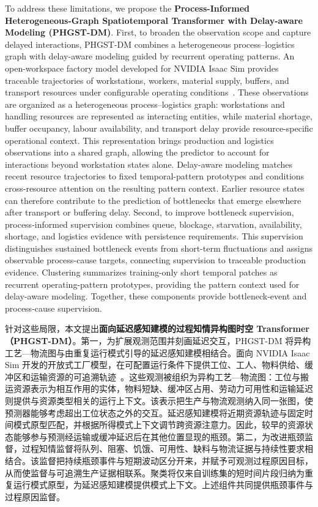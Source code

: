 \documentclass[a4paper,fleqn]{cas-dc}
\newcommand{\zhpara}[1]{%
  \par\begingroup\small\color{black!72}\noindent #1\par\endgroup}
\begin{document}
To address these limitations, we propose the \textbf{Process-Informed Heterogeneous-Graph Spatiotemporal Transformer with Delay-aware Modeling (PHGST-DM)}. First, to broaden the observation scope and capture delayed interactions, PHGST-DM combines a heterogeneous process--logistics graph with delay-aware modeling guided by recurrent operating patterns. An open-workspace factory model developed for NVIDIA Isaac Sim provides traceable trajectories of workstations, workers, material supply, buffers, and transport resources under configurable operating conditions~\cite{lu2020digital,isaacsim2026,xue2026safe}. These observations are organized as a heterogeneous process--logistics graph: workstations and handling resources are represented as interacting entities, while material shortage, buffer occupancy, labour availability, and transport delay provide resource-specific operational context. This representation brings production and logistics observations into a shared graph, allowing the predictor to account for interactions beyond workstation states alone. Delay-aware modeling matches recent resource trajectories to fixed temporal-pattern prototypes and conditions cross-resource attention on the resulting pattern context. Earlier resource states can therefore contribute to the prediction of bottlenecks that emerge elsewhere after transport or buffering delay. Second, to improve bottleneck supervision, process-informed supervision combines queue, blockage, starvation, availability, shortage, and logistics evidence with persistence requirements. This supervision distinguishes sustained bottleneck events from short-term fluctuations and assigns observable process-cause targets, connecting supervision to traceable production evidence. Clustering summarizes training-only short temporal patches as recurrent operating-pattern prototypes, providing the pattern context used for delay-aware modeling. Together, these components provide bottleneck-event and process-cause supervision.

\zhpara{针对这些局限，本文提出\textbf{面向延迟感知建模的过程知情异构图时空 Transformer（PHGST-DM）}。第一，为扩展观测范围并刻画延迟交互，PHGST-DM 将异构工艺—物流图与由重复运行模式引导的延迟感知建模相结合。面向 NVIDIA Isaac Sim 开发的开放式工厂模型，在可配置运行条件下提供工位、工人、物料供给、缓冲区和运输资源的可追溯轨迹~\cite{lu2020digital,isaacsim2026,xue2026safe}。这些观测被组织为异构工艺—物流图：工位与搬运资源表示为相互作用的实体，物料短缺、缓冲区占用、劳动力可用性和运输延迟则提供与资源类型相关的运行上下文。该表示把生产与物流观测纳入同一张图，使预测器能够考虑超出工位状态之外的交互。延迟感知建模将近期资源轨迹与固定时间模式原型匹配，并根据所得模式上下文调节跨资源注意力。因此，较早的资源状态能够参与预测经运输或缓冲延迟后在其他位置显现的瓶颈。第二，为改进瓶颈监督，过程知情监督将队列、阻塞、饥饿、可用性、缺料与物流证据与持续性要求相结合。该监督把持续瓶颈事件与短期波动区分开来，并赋予可观测过程原因目标，从而使监督与可追溯生产证据相联系。聚类将仅来自训练集的短时间片段归纳为重复运行模式原型，为延迟感知建模提供模式上下文。上述组件共同提供瓶颈事件与过程原因监督。}
\end{document}
